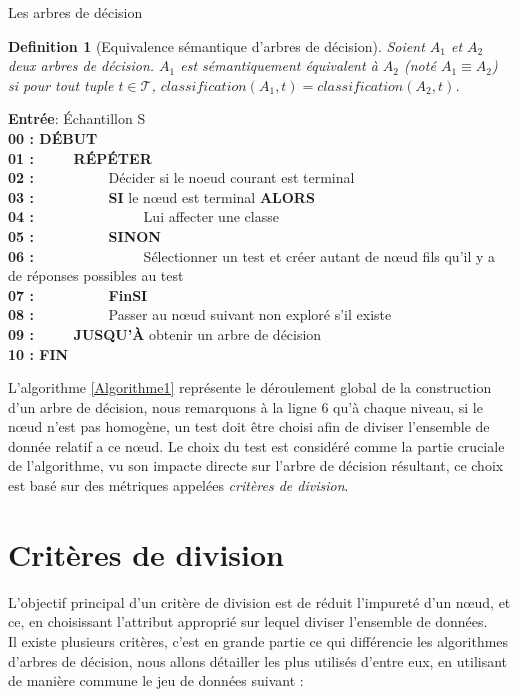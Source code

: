 \documentclass[a4paper, 11pt]{report}
\newtheorem{definition}{Definition}
\newcommand{\tupleset}{\ensuremath{\mathcal{T}}}
\begin{document}
\begin{chapter}{Les arbres de décision}
\begin{definition}[Equivalence sémantique d'arbres de décision]
  Soient $A_1$ et $A_2$ deux arbres de décision. $A_1$ est sémantiquement équivalent à $A_2$ (noté $A_1\equiv A_2$) si pour tout tuple $t\in\tupleset$, $classification(A_1,t) = classification(A_2,t)$.
\end{definition}

\begin{algorithm}[!h]
\renewcommand\thealgorithm{}
\caption{\textbf{1 } : Algorithme de création d'un arbre de décision}
\begin{algorithmic}
\STATE \textbf{Entrée}: Échantillon S\\
\textbf{00 : DÉBUT}\\
\textbf{01 : }\ \ \ \ \ \textbf{RÉPÉTER}\\
\textbf{02 : }\ \ \ \ \ \ \ \ \ \ Décider si le noeud courant est terminal\\
\textbf{03 : }\ \ \ \ \ \ \ \ \ \ \textbf{SI} le nœud est terminal \textbf{ALORS}\\
\textbf{04 : }\ \ \ \ \ \ \ \ \ \ \ \ \ \ \ Lui affecter une classe\\
\textbf{05 : }\ \ \ \ \ \ \ \ \ \ \textbf{SINON}\\
\textbf{06 : }\ \ \ \ \ \ \ \ \ \ \ \ \ \ \ Sélectionner un test et créer autant de nœud fils qu'il y a de réponses possibles au test\\
\textbf{07 : }\ \ \ \ \ \ \ \ \ \ \textbf{FinSI}\\
\textbf{08 : }\ \ \ \ \ \ \ \ \ \ Passer au nœud suivant non exploré s'il existe\\
\textbf{09 : }\ \ \ \ \ \textbf{JUSQU'À} obtenir un arbre de décision\\
\textbf{10 : FIN}
\label{Algorithme1}
\end{algorithmic}
\addtocounter{algorithm}{-1}
\end{algorithm}


L'algorithme \ref{Algorithme1} représente le déroulement global de la construction d'un arbre de décision, nous remarquons à la ligne 6 qu'à chaque niveau, si le nœud n'est pas homogène, un test doit être choisi afin de diviser l'ensemble de donnée relatif a ce nœud. Le choix du test est considéré comme la partie cruciale de l'algorithme, vu son impacte directe sur l'arbre de décision résultant, ce choix est basé sur des métriques appelées \emph{critères de division}.\\ 
\section{Critères de division}
L'objectif principal d'un critère de division est de réduit l'impureté d'un nœud, et ce, en choisissant l'attribut approprié sur lequel diviser l'ensemble de données.\\
Il existe plusieurs critères, c'est en grande partie ce qui différencie les algorithmes d'arbres de décision, nous allons détailler les plus utilisés d'entre eux, en utilisant de manière commune le jeu de données suivant :
\begin{figure}[!h]
\begin{center}


\end{center}
\end{figure}
\end{chapter}
\end{document}
